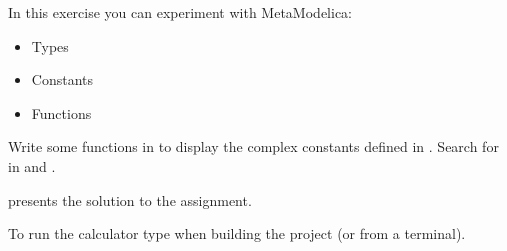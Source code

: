 In this exercise you can experiment with MetaModelica:
\begin{itemize}
\item Types
\item Constants
\item Functions
\end{itemize}

Write some functions in  to  display the complex constants defined in .
Search for  in  and .

 presents the solution to the assignment.

To run the calculator type  when building the project (or  from a terminal).
